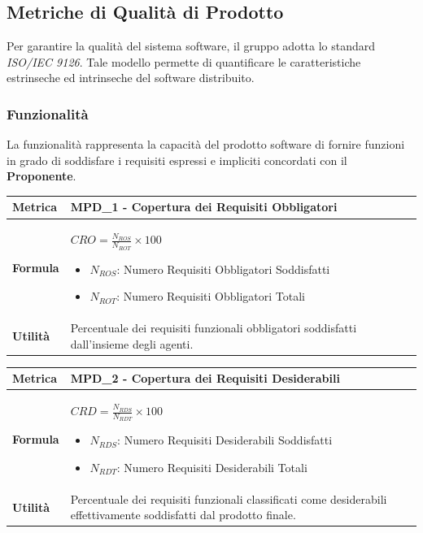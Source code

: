 \documentclass[12pt, a4paper]{article}
\begin{document}
\subsection{Metriche di Qualità di Prodotto}
Per garantire la qualità del sistema software, il gruppo adotta lo standard \textit{ISO/IEC 9126}. Tale modello permette di quantificare le caratteristiche estrinseche ed intrinseche del software distribuito.

\subsubsection{Funzionalità}
La funzionalità rappresenta la capacità del prodotto software di fornire funzioni in grado di soddisfare i requisiti espressi e impliciti concordati con il \textbf{Proponente}.

\begin{table}[H]
\centering
\renewcommand{\arraystretch}{1.5}
\begin{tabular}{|l|p{12cm}|}
\hline
\textbf{Metrica} & MPD\_1 - Copertura dei Requisiti Obbligatori \\ \hline
\textbf{Formula} & $CRO = \frac{N_{ROS}}{N_{ROT}} \times 100$
\begin{itemize}
    \item $N_{ROS}$: Numero Requisiti Obbligatori Soddisfatti
    \item $N_{ROT}$: Numero Requisiti Obbligatori Totali
\end{itemize} \\ \hline
\textbf{Utilità} & Percentuale dei requisiti funzionali obbligatori soddisfatti dall'insieme degli agenti. \\ \hline
\end{tabular}
\end{table}

\begin{table}[H]
\centering
\renewcommand{\arraystretch}{1.5}
\begin{tabular}{|l|p{12cm}|}
\hline
\textbf{Metrica} & MPD\_2 - Copertura dei Requisiti Desiderabili \\ \hline
\textbf{Formula} & $CRD = \frac{N_{RDS}}{N_{RDT}} \times 100$
\begin{itemize}
    \item $N_{RDS}$: Numero Requisiti Desiderabili Soddisfatti
    \item $N_{RDT}$: Numero Requisiti Desiderabili Totali
\end{itemize} \\ \hline
\textbf{Utilità} & Percentuale dei requisiti funzionali classificati come desiderabili effettivamente soddisfatti dal prodotto finale. \\ \hline
\end{tabular}
\end{table}
\end{document}

